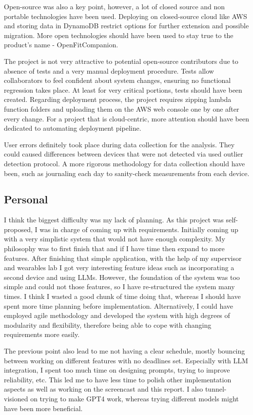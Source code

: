 Open-source was also a key point, however, a lot of closed source and non portable technologies have been used. Deploying on closed-source cloud like AWS and storing data in DynamoDB restrict options for further extension and possible migration. More open technologies should have been used to stay true to the product's name - OpenFitCompanion.

The project is not very attractive to potential open-source contributors due to absence of tests and a very manual deployment procedure. Tests allow collaborators to feel confident about system changes, ensuring no functional regression takes place. At least for very critical portions, tests should have been created. Regarding deployment process, the project requires zipping lambda function folders and uploading them on the AWS web console one by one after every change. For a project that is cloud-centric, more attention should have been dedicated to automating deployment pipeline.

User errors definitely took place during data collection for the analysis. They could caused differences between devices that were not detected via used outlier detection protocol. A more rigorous methodology for data collection should have been, such as journaling each day to sanity-check measurements from each device. 
\subsection{Personal}
I think the biggest difficulty was my lack of planning. As this project was self-proposed, I was in charge of coming up with requirements. Initially coming up with a very simplistic system that would not have enough complexity. My philosophy was to first finish that and if I have time then expand to more features. After finishing that simple application, with the help of my supervisor and wearables lab I got very interesting feature ideas  such as incorporating a second device and using LLMs. However, the foundation of the system was too simple and could not those features, so I have re-structured the system many times. I think I wasted a good chunk of time doing that, whereas I should have spent more time planning before implementation. Alternatively, I could have employed agile methodology and developed the system with high degrees of modularity and flexibility, therefore being able to cope with changing requirements more easily.

The previous point also lead to me not having a clear schedule, mostly bouncing between working on different features with no deadlines set. Especially with LLM integration, I spent too much time on designing prompts, trying to improve reliability, etc. This led me to have less time to polish other implementation aspects as well as working on the screencast and this report. I also tunnel-visioned on trying to make GPT4 work, whereas trying different models might have been more beneficial. 
